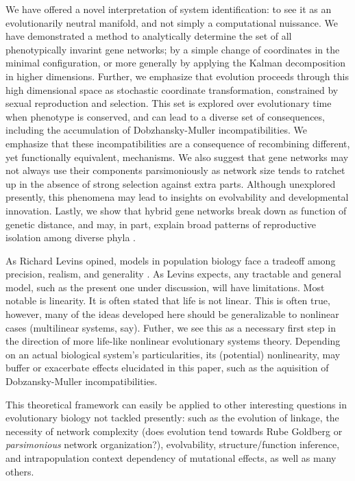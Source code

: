 \documentclass[9 pt]{article}
\newcommand{\jss}[1]{{\color{olive}\it #1}}
\newcommand{\1}{\mathbbm{1}}
\begin{document}
\begin{multicols}{2}
  We have offered a novel interpretation of system identification: to see it as an evolutionarily neutral manifold, and not simply a computational nuissance. We have demonstrated a method to analytically determine the set of all phenotypically invarint gene networks; by a simple change of coordinates in the minimal configuration, or more generally by applying the Kalman decomposition in higher dimensions. Further, we emphasize that evolution proceeds through this high dimensional space as stochastic coordinate transformation, constrained by sexual reproduction and selection. This set is explored over evolutionary time when phenotype is conserved, and can lead to a diverse set of consequences, including the accumulation of Dobzhansky-Muller incompatibilities. We emphasize that these incompatibilities are a consequence of recombining different, yet functionally equivalent, mechanisms. We also suggest that gene networks may not always use their components parsimoniously as network size tends to ratchet up in the absence of strong selection against extra parts. Although unexplored presently, this phenomena may lead to insights on evolvability and developmental innovation. Lastly, we show that hybrid gene networks break down as function of genetic distance, and may, in part, explain broad patterns of reproductive isolation among diverse phyla \citep{roux2016shedding}.

  As Richard Levins opined, models in population biology face a tradeoff among precision, realism, and generality \citep{levins1966strategy}. As Levins expects, any tractable and general model, such as the present one under discussion, will have limitations. Most notable is linearity. It is often stated that life is not linear. This is often true, however, many of the ideas developed here should be generalizable to nonlinear cases (multilinear systems, say). Futher, we see this as a necessary first step in the direction of more life-like nonlinear evolutionary systems theory. Depending on an actual biological system's particularities, its (potential) nonlinearity, may buffer or exacerbate effects elucidated in this paper, such as the aquisition of Dobzansky-Muller incompatibilities.

  This theoretical framework can easily be applied to other interesting questions in evolutionary biology not tackled presently: such as the evolution of linkage, the necessity of network complexity (does evolution tend towards Rube Goldberg or \jss{parsimonious} network organization?), evolvability, structure/function inference, and intrapopulation context dependency of mutational effects, as well as many others.




      \tiny


\end{multicols}
\end{document}
